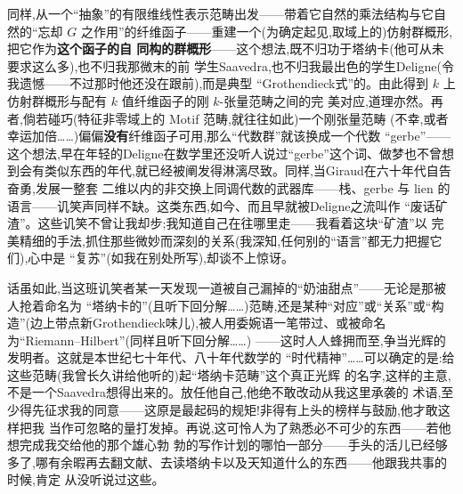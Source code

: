 同样,从一个“抽象”的有限维线性表示范畴出发——带着它自然的乘法结构与它自然的“忘却 $G$
之作用”的纤维函子——重建一个(为确定起见,取域上的)仿射群概形,把它作为\textbf{这个函子的自
同构的群概形}——这个想法,既不归功于塔纳卡(他可从未要求这么多),也不归我那微末的前
学生Saavedra,也不归我最出色的学生Deligne(令我遗憾——不过那时他还没在跟前),而是典型
“Grothendieck式”的。由此得到 $k$ 上仿射群概形与配有 $k$ 值纤维函子的刚 $k$-张量范畴之间的完
美对应,道理亦然。再者,倘若碰巧(特征非零域上的 Motif 范畴,就往往如此)一个刚张量范畴
(不幸,或者幸运加倍……)偏偏\textbf{没有}纤维函子可用,那么“代数群”就该换成一个代数
“gerbe”——这个想法,早在年轻的Deligne在数学里还没听人说过“gerbe”这个词、做梦也不曾想
到会有类似东西的年代,就已经被阐发得淋漓尽致。同样,当Giraud在六十年代自告奋勇,发展一整套
二维以内的非交换上同调代数的武器库\dmark{}——栈、gerbe 与 lien 的语言——讥笑声同样不缺。这类东西,如今、而且早就被Deligne之流叫作
“废话矿渣”。这些讥笑不曾让我却步;我知道自己在往哪里走——我看着这块“矿渣”以
完美精细的手法,抓住那些微妙而深刻的关系(我深知,任何别的“语言”都无力把握它们),心中是
“复苏”(如我在别处所写),却谈不上惊讶。

话虽如此,当这班讥笑者某一天发现一道被自己漏掉的“奶油甜点”——无论是那被人抢着命名为
“塔纳卡的”(且听下回分解……)范畴,还是某种“对应”或“关系”或“构造”(边上带点新Grothendieck味儿),被人用委婉语一笔带过、或被命名为“Riemann--Hilbert”(同样且听下回分解……)
——这时人人蜂拥而至,争当光辉的发明者。这就是本世纪七十年代、八十年代数学的
“时代精神”……可以确定的是:给这些范畴(我曾长久讲给他听的)起“塔纳卡范畴”这个真正光辉
的名字,这样的主意,不是一个Saavedra想得出来的。放任他自己,他绝不敢改动从我这里承袭的
术语,至少得先征求我的同意——这原是最起码的规矩!非得有上头的榜样与鼓励,他才敢\dmark{}这样把我
当作可忽略的量打发掉。再说,这可怜人为了熟悉必不可少的东西——若他想完成我交给他的那个雄心勃
勃的写作计划的哪怕一部分——手头的活儿已经够多了,哪有余暇再去翻文献、去读塔纳卡以及天知道什么的东西——他跟我共事的时候,肯定
从没听说过这些。

